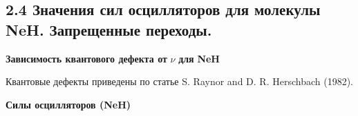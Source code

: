\documentclass[a4paper]{article}
\begin{document}
\subsection[2.4 Значения сил
осцилляторов для молекулы NeH. Запрещенные
переходы.]{2.4
Значения сил осцилляторов для
молекулы \foreignlanguage{english}{NeH}.
Запрещенные
переходы.}
\hypertarget{RefHeading4705463868395}{}{\centering
\textbf{Зависимость
квантового
дефекта от }\foreignlanguage{english}{\textbf{$\nu $}}\textbf{
для }\foreignlanguage{english}{\textbf{NeH}}\textbf{ }
\par}

Квантовые дефекты приведены по
статье \foreignlanguage{english}{S}. \foreignlanguage{english}{Raynor}
\foreignlanguage{english}{and} \foreignlanguage{english}{D}. \foreignlanguage{english}{R}.
\foreignlanguage{english}{Herschbach} (1982).


\bigskip

{\centering
\textbf{Силы
осцилляторов
(}\foreignlanguage{english}{\textbf{NeH}}\textbf{)}
\par}
\end{document}
